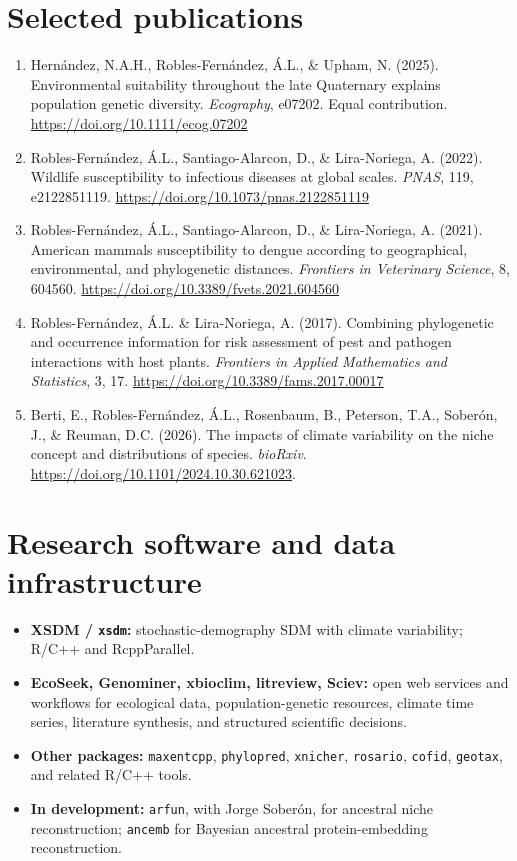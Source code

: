 \documentclass[10pt,letterpaper]{article}
\begin{document}
\section*{Selected publications}
\begin{enumerate}[leftmargin=1.25em,label={}]
\item[*] Hernández, N.A.H., Robles-Fernández, Á.L., \& Upham, N. (2025). Environmental suitability throughout the late Quaternary explains population genetic diversity. \emph{Ecography}, e07202. Equal contribution.  \href{https://doi.org/10.1111/ecog.07202}{https://doi.org/10.1111/ecog.07202}
\item[*] Robles-Fernández, Á.L., Santiago-Alarcon, D., \& Lira-Noriega, A. (2022). Wildlife susceptibility to infectious diseases at global scales. \emph{PNAS}, 119, e2122851119. \href{https://doi.org/10.1073/pnas.2122851119}{https://doi.org/10.1073/pnas.2122851119}
\item[*] Robles-Fernández, Á.L., Santiago-Alarcon, D., \& Lira-Noriega, A. (2021). American mammals susceptibility to dengue according to geographical, environmental, and phylogenetic distances. \emph{Frontiers in Veterinary Science}, 8, 604560. \href{https://doi.org/10.3389/fvets.2021.604560}{https://doi.org/10.3389/fvets.2021.604560}
\item[*] Robles-Fernández, Á.L. \& Lira-Noriega, A. (2017). Combining phylogenetic and occurrence information for risk assessment of pest and pathogen interactions with host plants. \emph{Frontiers in Applied Mathematics and Statistics}, 3, 17.  \href{https://doi.org/10.3389/fams.2017.00017}{https://doi.org/10.3389/fams.2017.00017}
\item Berti, E., Robles-Fernández, Á.L., Rosenbaum, B., Peterson, T.A., Soberón, J., \& Reuman, D.C. (2026). The impacts of climate variability on the niche concept and distributions of species. \emph{bioRxiv}. \href{https://doi.org/10.1101/2024.10.30.621023}{https://doi.org/10.1101/2024.10.30.621023}.
\end{enumerate}

\section*{Research software and data infrastructure}
\begin{itemize}
\item \textbf{XSDM / \texttt{xsdm}:} stochastic-demography SDM with climate variability; R/C++ and RcppParallel.
\item \textbf{EcoSeek, Genominer, xbioclim, litreview, Sciev:} open web services and workflows for ecological data, population-genetic resources, climate time series, literature synthesis, and structured scientific decisions.
\item \textbf{Other packages:} \texttt{maxentcpp}, \texttt{phylopred}, \texttt{xnicher}, \texttt{rosario}, \texttt{cofid}, \texttt{geotax}, and related R/C++ tools.
\item \textbf{In development:} \texttt{arfun}, with Jorge Soberón, for ancestral niche reconstruction; \texttt{ancemb} for Bayesian ancestral protein-embedding reconstruction.
\end{itemize}
\end{document}

